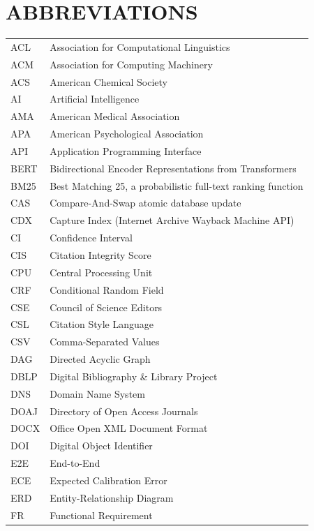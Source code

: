 \chapter*{ABBREVIATIONS}

{\renewcommand{\arraystretch}{1.04}
\begin{longtable}{P{0.22}P{0.78}}
\endfirsthead
\endhead
\endfoot
\endlastfoot
ACL & Association for Computational Linguistics \\
ACM & Association for Computing Machinery \\
ACS & American Chemical Society \\
AI & Artificial Intelligence \\
AMA & American Medical Association \\
APA & American Psychological Association \\
API & Application Programming Interface \\
BERT & Bidirectional Encoder Representations from Transformers \\
BM25 & Best Matching 25, a probabilistic full-text ranking function \\
CAS & Compare-And-Swap atomic database update \\
CDX & Capture Index (Internet Archive Wayback Machine API) \\
CI & Confidence Interval \\
CIS & Citation Integrity Score \\
CPU & Central Processing Unit \\
CRF & Conditional Random Field \\
CSE & Council of Science Editors \\
CSL & Citation Style Language \\
CSV & Comma-Separated Values \\
DAG & Directed Acyclic Graph \\
DBLP & Digital Bibliography \& Library Project \\
DNS & Domain Name System \\
DOAJ & Directory of Open Access Journals \\
DOCX & Office Open XML Document Format \\
DOI & Digital Object Identifier \\
E2E & End-to-End \\
ECE & Expected Calibration Error \\
ERD & Entity-Relationship Diagram \\
FR & Functional Requirement \\

\end{longtable}}
